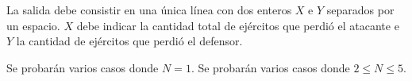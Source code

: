 \documentclass{oci}
\begin{document}
\begin{outputDescription}
  La salida debe consistir en una única línea con dos enteros $X$ e $Y$ separados por un espacio.
  $X$ debe indicar la cantidad total de ejércitos que perdió el
  atacante e $Y$ la cantidad de ejércitos que perdió el defensor.
\end{outputDescription}

\begin{scoreDescription}
   Se probarán varios casos donde $N=1$.
   Se probarán varios casos donde $2\leq N \leq 5$.
\end{scoreDescription}

\begin{sampleDescription}
\end{sampleDescription}
\end{document}
